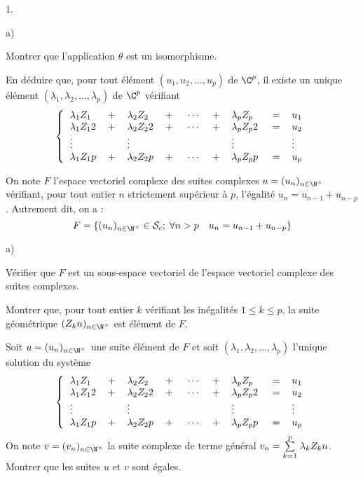 \documentclass[11pt]{article}%
\begin{document}
\begin{noliste}{1.}
\begin{noliste}{a)}
 \setlength{\itemsep}{2mm}
\item Montrer que l'application $\theta $ est un isomorphisme.

\item En déduire que, pour tout élément $(u_{1},u_{2},\dots,u_{p})$ de
$\C^{p}$, il existe un unique élément $(\lambda_{1},\lambda
_{2},\dots,\lambda_{p})$ de $\C^{p}$ vérifiant 
\[
\left\{ 
\begin{tabular}{lllllllll}
$\lambda_{1}Z_{1}$ & $ + $ & $\lambda_{2}Z_{2}$ & $ + $ & $\;\cdots $ &
$ + $ & $\lambda_{p}Z_{p}$ & $\; = $ & $u_{1}$ \\
$\lambda_{1}Z_{1}{2}$ & $ + $ & $\lambda_{2}Z_{2}{2}$ & $ + $ &
$\;\cdots $
 & $ + $ & $\lambda_{p}Z_{p}{2}$ & $\; = $ & $u_{2}$ \\
$\vdots $ & & $\vdots $ & & & & $\vdots $ & & $\vdots $ \\
$\lambda_{1}Z_{1}{p}$ & $ + $ & $\lambda_{2}Z_{2}{p}$ & $ + $ &
$\;\cdots $
 & $ + $ & $\lambda_{p}Z_{p}{p}$ & $\; = $ &
$u_{p}$\end{tabular}\right.
\]
\end{noliste}

\item On note $F$ l'espace vectoriel complexe des suites complexes $u =
(u_{n})_{n\in \N^{\times }}$ vérifiant, pour tout entier $n$
strictement supérieur à $p$, l'égalité $u_{n} = u_{n-1} + u_{n-p}$.
Autrement
dit, on a :
\[
F = \{(u_{n})_{n\in \N^{\times }}\in \mathcal{S}_{c};\;\forall
n>p\quad u_{n} = u_{n-1} + u_{n-p}\}
\]

\begin{noliste}{a)}
 \setlength{\itemsep}{2mm}
\item Vérifier que $F$ est un sous-espace vectoriel de l'espace
vectoriel
complexe des suites complexes.

\item Montrer que, pour tout entier $k$ vérifiant les inégalités $1\leq
k\leq p$, la suite géométrique $(Z_{k}{n})_{n\in \N^{\times }}$
est élément de $F$.

\item Soit $u = (u_{n})_{n\in \N^{\times }}$ une suite élément de $F$
et soit $(\lambda_{1},\lambda_{2},\dots,\lambda_{p})$ l'unique solution
du système 
\[
\left\{ 
\begin{tabular}{lllllllll}
$\lambda_{1}Z_{1}$ & $ + $ & $\lambda_{2}Z_{2}$ & $ + $ & $\;\cdots $ &
$ + $ & $\lambda_{p}Z_{p}$ & $\; = $ & $u_{1}$ \\
$\lambda_{1}Z_{1}{2}$ & $ + $ & $\lambda_{2}Z_{2}{2}$ & $ + $ &
$\;\cdots $
 & $ + $ & $\lambda_{p}Z_{p}{2}$ & $\; = $ & $u_{2}$ \\
$\vdots $ & & $\vdots $ & & & & $\vdots $ & & $\vdots $ \\
$\lambda_{1}Z_{1}{p}$ & $ + $ & $\lambda_{2}Z_{2}{p}$ & $ + $ &
$\;\cdots $
 & $ + $ & $\lambda_{p}Z_{p}{p}$ & $\; = $ &
$u_{p}$\end{tabular}\right.
\]
On note $v = (v_{n})_{n\in \N^{\times }}$ la suite complexe de terme
général $v_{n} = {\textstyle\sum\limits_{k = 1}^{p}}\hspace{.1cm}\lambda_{k}Z_{k}{n}$.\\
Montrer que les suites $u$ et $v$ sont égales.


\end{noliste}
\end{noliste}
\end{document}
